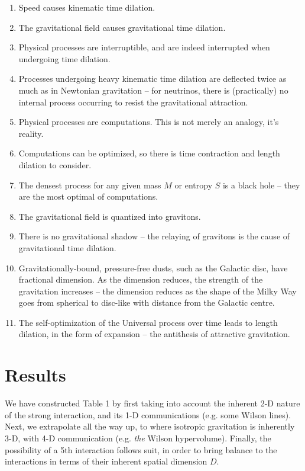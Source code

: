 \documentclass[12pt]{article}
\begin{document}
\begin{enumerate}
\item Speed causes kinematic time dilation.
\item The gravitational field causes gravitational time dilation.
\item Physical processes are interruptible, and are indeed interrupted when undergoing time dilation.
\item Processes undergoing heavy kinematic time dilation are deflected twice as much as in Newtonian gravitation -- for neutrinos, there is (practically) no internal process occurring to resist the gravitational attraction.
\item Physical processes are computations.
This is not merely an analogy, it's reality.
\item Computations can be optimized, so there is time contraction and length dilation to consider.
\item The densest process for any given mass $M$ or entropy $S$ is a black hole -- they are the most optimal of computations.
\item The gravitational field is quantized into gravitons.
\item There is no gravitational shadow -- the relaying of gravitons is the cause of gravitational time dilation.
\item Gravitationally-bound, pressure-free dusts, such as the Galactic disc, have fractional dimension. As the dimension reduces, the strength of the gravitation increases -- the dimension reduces as the shape of the Milky Way goes from spherical to disc-like with distance from the Galactic centre.
\item The self-optimization of the Universal process over time leads to length dilation, in the form of expansion -- the antithesis of attractive gravitation.
\end{enumerate}







\section{Results}

We have constructed Table 1 by first taking into account the inherent 2-D nature of the strong interaction, and its 1-D communications (e.g. some Wilson lines).
Next, we extrapolate all the way up, to where isotropic gravitation is inherently 3-D, with 4-D communication (e.g. {\textit{the}} Wilson hypervolume). 
Finally, the possibility of a 5th interaction follows suit, in order to bring balance to the interactions in terms of their inherent spatial dimension $D$.
\end{document}
